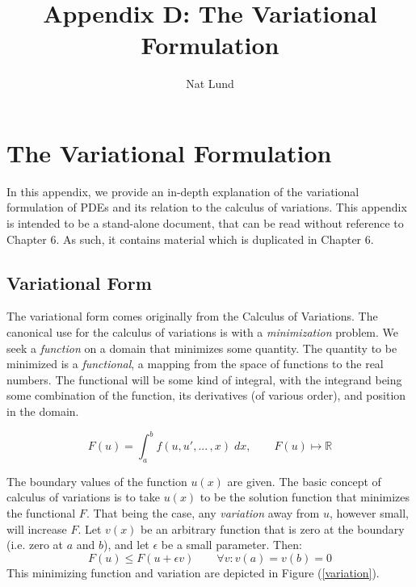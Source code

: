 \documentclass[12pt, a4paper, twoside, openright]{book}
\title{Appendix D: The Variational Formulation}
\author{Nat Lund}
\begin{document}
\chapter{The Variational Formulation}\label{C:variational}

In this appendix, we provide an in-depth explanation of the variational formulation of PDEs and its relation to the calculus of variations.  This appendix is intended to be a stand-alone document, that can be read without reference to Chapter 6.  As such, it contains material which is duplicated in Chapter 6.

\clearpage
\section{Variational Form}

The variational form comes originally from the Calculus of Variations.  The canonical use for the calculus of variations is with a \emph{minimization} problem.  We seek a \emph{function} on a domain that minimizes some quantity.  The quantity to be minimized is a \emph{functional}, a mapping from the space of functions to the real numbers.  The functional will be some kind of integral, with the integrand being some combination of the function, its derivatives (of various order), and position in the domain.

\begin{equation}
F(u) = \int_a^b f(u,u', ...\, ,x) \; dx,  \qquad F(u) \mapsto \mathbb{R}
\end{equation} 

The boundary values of the function $u(x)$ are given.  The basic concept of calculus of variations is to take $u(x)$ to be the solution function that minimizes the functional $F$.  That being the case, any \emph{variation} away from $u$, however small, will increase $F$.  Let $v(x)$ be an arbitrary function that is zero at the boundary (i.e. zero at $a$ and $b$), and let $\epsilon$ be a small parameter. Then:
\begin{equation}
F(u) \leq F(u + \epsilon v) \qquad \forall v: v(a) = v(b) = 0
\end{equation}
This minimizing function and variation are depicted in Figure (\ref{variation}).
\end{document}
